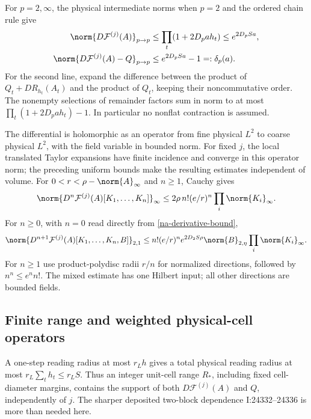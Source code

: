 For $p=2,\infty$, the physical intermediate norms when $p=2$ and
the ordered chain rule give
\begin{align}
 \norm{D\mathcal F^{(j)}(A)}_{p\to p}
    &\le\prod_t(1+2D_pa h_t)\le e^{2D_pSa},
 \label{na-derivative-bound}\\
 \norm{D\mathcal F^{(j)}(A)-Q}_{p\to p}
    &\le e^{2D_pSa}-1=:\delta_p(a).
 \label{na-differential-deviation}
\end{align}
For the second line, expand the difference between the product of
$Q_t+DR_{h_t}(A_t)$ and the product of $Q_t$, keeping their
noncommutative order. The nonempty selections of remainder factors
sum in norm to at most $\prod_t(1+2D_pa h_t)-1$. In particular
no nonflat contraction is assumed.

The differential is holomorphic as an operator from fine physical
$L^2$ to coarse physical $L^2$, with the field variable in bounded
norm. For fixed $j$, the local translated Taylor expansions have
finite incidence and converge in this operator norm; the preceding
uniform bounds make the resulting estimates independent of volume.
For $0<r<\rho-\norm{A}_\infty$ and $n\ge1$, Cauchy gives
\begin{equation}
 \norm{D^n\mathcal F^{(j)}(A)[K_1,\ldots,K_n]}_\infty
 \le2\rho\,n!(e/r)^n\prod_i\norm{K_i}_\infty.
 \label{na-cauchy-infty}
\end{equation}
For $n\ge0$, with $n=0$ read directly from
\eqref{na-derivative-bound},
\begin{equation}
 \norm{D^{n+1}\mathcal F^{(j)}(A)[K_1,\ldots,K_n,B]}_{2,1}
 \le n!(e/r)^n e^{2D_2S\rho}
       \norm{B}_{2,\eta}\prod_i\norm{K_i}_\infty.
 \label{na-cauchy-mixed}
\end{equation}
For $n\ge1$ use product-polydisc radii $r/n$ for normalized
directions, followed by $n^n\le e^n n!$. The mixed estimate has one
Hilbert input; all other directions are bounded fields.

\subsection{Finite range and weighted physical-cell operators}
\label{na-weighted}

A one-step reading radius at most $r_Lh$ gives a total physical
reading radius at most $r_L\sum_t h_t\le r_LS$. Thus an integer
unit-cell range $R_*$, including fixed cell-diameter margins,
contains the support of both $D\mathcal F^{(j)}(A)$ and $Q$,
independently of $j$. The sharper deposited two-block dependence
I:24332--24336 is more than needed here.


